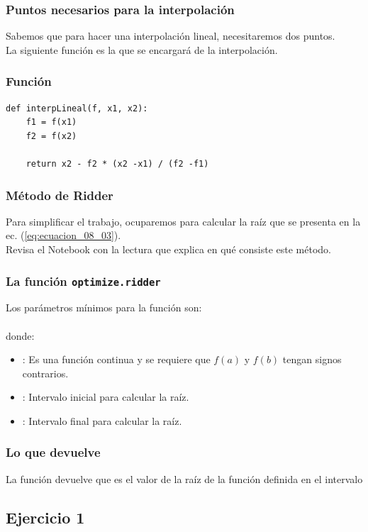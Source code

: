\documentclass[12pt]{beamer}
\begin{document}
\begin{frame}
\frametitle{Puntos necesarios para la interpolación}
Sabemos que para hacer una interpolación lineal, necesitaremos dos puntos.
\\
\bigskip
\pause
La siguiente función  es la que se encargará de la interpolación.
\end{frame}
\begin{frame}[fragile]
\frametitle{Función }
\begin{lstlisting}[caption=Código para realizar la interpolación lineal]
def interpLineal(f, x1, x2):
    f1 = f(x1)
    f2 = f(x2)

    return x2 - f2 * (x2 -x1) / (f2 -f1)
\end{lstlisting}
\end{frame}
\begin{frame}
\frametitle{Método de Ridder}
Para simplificar el trabajo, ocuparemos  para calcular la raíz que se presenta en la ec. (\ref{eq:ecuacion_08_03}).
\\
\bigskip
Revisa el Notebook con la lectura que explica en qué consiste este método.
\end{frame}
\begin{frame}
\frametitle{La función \texttt{optimize.ridder}}
Los parámetros mínimos para la función  son:
\\
\pause
{}
\\
donde:
\begin{itemize}
\item {}: Es una función continua y se requiere que $f (a)$ y $f (b)$ tengan signos contrarios.
\item {}: Intervalo inicial para calcular la raíz.
\item {}: Intervalo final para calcular la raíz.
\end{itemize}
\end{frame}
\begin{frame}
\frametitle{Lo que devuelve }
La función  devuelve  que es el valor de la raíz de la función  definida en el intervalo \funcionazul{$[a, b]$} 
\end{frame}

\subsection{Ejercicio 1}
\end{document}
